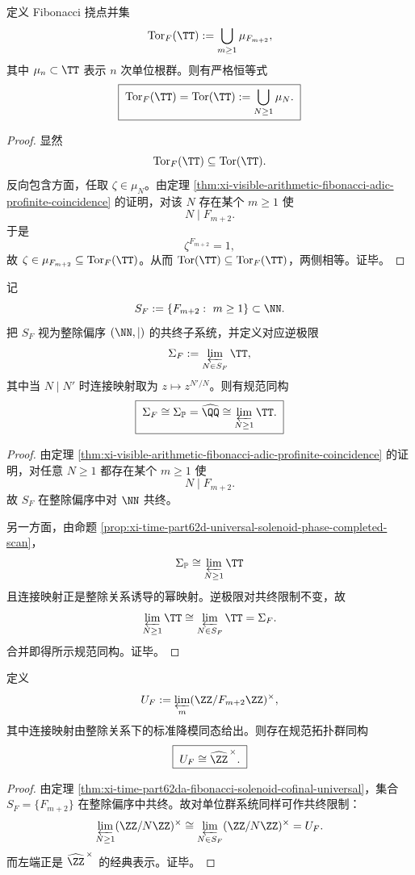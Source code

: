 \begin{theorem}\label{thm:xi-time-part62da-fibonacci-torsion-saturates-circle}
定义 Fibonacci 挠点并集
\[
\mathrm{Tor}_F(\TT):=\bigcup_{m\ge 1}\mu_{F_{m+2}},
\]
其中 \(\mu_n\subset\TT\) 表示 \(n\) 次单位根群。则有严格恒等式
\[
\boxed{\;
\mathrm{Tor}_F(\TT)=\mathrm{Tor}(\TT):=\bigcup_{N\ge 1}\mu_N.\;}
\]
\end{theorem}
\begin{proof}
显然
\[
\mathrm{Tor}_F(\TT)\subseteq \mathrm{Tor}(\TT).
\]
反向包含方面，任取 \(\zeta\in\mu_N\)。由定理 \ref{thm:xi-visible-arithmetic-fibonacci-adic-profinite-coincidence} 的证明，对该 \(N\) 存在某个 \(m\ge 1\) 使
\[
N\mid F_{m+2}.
\]
于是
\[
\zeta^{F_{m+2}}=1,
\]
故 \(\zeta\in \mu_{F_{m+2}}\subseteq \mathrm{Tor}_F(\TT)\)。从而 \(\mathrm{Tor}(\TT)\subseteq \mathrm{Tor}_F(\TT)\)，两侧相等。证毕。
\end{proof}

\begin{theorem}\label{thm:xi-time-part62da-fibonacci-solenoid-cofinal-universal}
记
\[
S_F:=\{F_{m+2}:\ m\ge 1\}\subset \NN.
\]
把 \(S_F\) 视为整除偏序 \((\NN,\mid)\) 的共终子系统，并定义对应逆极限
\[
\Sigma_F:=\varprojlim_{N\in S_F}\TT,
\]
其中当 \(N\mid N'\) 时连接映射取为 \(z\mapsto z^{N'/N}\)。则有规范同构
\[
\boxed{\;
\Sigma_F\cong \Sigma_{\mathbb P}=\widehat{\QQ}\cong \varprojlim_{N\ge 1}\TT.\;}
\]
\end{theorem}
\begin{proof}
由定理 \ref{thm:xi-visible-arithmetic-fibonacci-adic-profinite-coincidence} 的证明，对任意 \(N\ge 1\) 都存在某个 \(m\ge 1\) 使
\[
N\mid F_{m+2}.
\]
故 \(S_F\) 在整除偏序中对 \(\NN\) 共终。

另一方面，由命题 \ref{prop:xi-time-part62d-universal-solenoid-phase-completed-scan}，
\[
\Sigma_{\mathbb P}\cong \varprojlim_{N\ge 1}\TT
\]
且连接映射正是整除关系诱导的幂映射。逆极限对共终限制不变，故
\[
\varprojlim_{N\ge 1}\TT\cong \varprojlim_{N\in S_F}\TT=\Sigma_F.
\]
合并即得所示规范同构。证毕。
\end{proof}

\begin{theorem}\label{thm:xi-time-part62da-fibonacci-unit-limit-zhat-units}
定义
\[
U_F:=\varprojlim_{m}(\ZZ/F_{m+2}\ZZ)^\times,
\]
其中连接映射由整除关系下的标准降模同态给出。则存在规范拓扑群同构
\[
\boxed{\;
U_F\cong \widehat{\ZZ}^{\,\times}.\;}
\]
\end{theorem}
\begin{proof}
由定理 \ref{thm:xi-time-part62da-fibonacci-solenoid-cofinal-universal}，集合 \(S_F=\{F_{m+2}\}\) 在整除偏序中共终。故对单位群系统同样可作共终限制：
\[
\varprojlim_{N\ge 1}(\ZZ/N\ZZ)^\times
\cong
\varprojlim_{N\in S_F}(\ZZ/N\ZZ)^\times
=
U_F.
\]
而左端正是 \(\widehat{\ZZ}^{\,\times}\) 的经典表示。证毕。
\end{proof}

